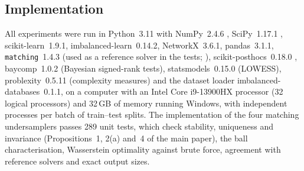 \subsection{Implementation}\label{sec:design:implementation}

All experiments were run in Python~3.11 with NumPy~2.4.6 \citep{harris2020array}, SciPy~1.17.1 \citep{virtanen2020scipy}, scikit-learn~1.9.1, imbalanced-learn~0.14.2, NetworkX~3.6.1, pandas~3.1.1, \texttt{matching}~1.4.3 (used as a reference solver in the tests; \citealp{wilde2020matching}), scikit-posthocs~0.18.0 \citep{terpilowski2019scikit}, baycomp~1.0.2 (Bayesian signed-rank tests), statsmodels~0.15.0 (LOWESS), problexity~0.5.11 (complexity measures) and the dataset loader imbalanced-databases~0.1.1, on a computer with an Intel Core i9-13900HX processor (32 logical processors) and 32\,GB of memory running Windows, with independent processes per batch of train--test splits. The implementation of the four matching undersamplers passes 289 unit tests, which check stability, uniqueness and invariance (Propositions~1, 2(a) and~4 of the main paper), the ball characterisation, Wasserstein optimality against brute force, agreement with reference solvers and exact output sizes.
